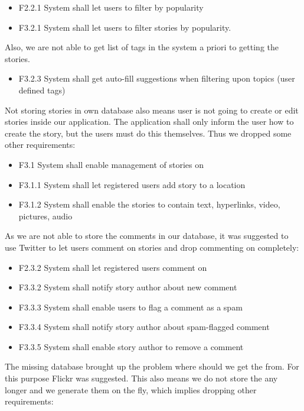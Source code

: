 \documentclass[11pt]{book}
\begin{document}
\begin{itemize}
  \item F2.2.1 System shall let users to filter \wallentityp by popularity
  \item F3.2.1 System shall let users to filter stories by popularity.
\end{itemize}

Also, we are not able to get list of tags in the system a priori to getting the stories.

\begin{itemize}
  \item F3.2.3 System shall get auto-fill suggestions when filtering upon topics (user defined tags)
\end{itemize}

Not storing stories in own database also means user is not going to create or edit stories inside our application. The application shall only inform the user how to create the story, but the users must do this themselves. Thus we dropped some other requirements:

\begin{itemize}
  \item F3.1 System shall enable management of stories on \wallentityp
  \item F3.1.1 System shall let registered users add story to a location
  \item F3.1.2 System shall enable the stories to contain text, hyperlinks, video, pictures, audio
\end{itemize}

As we are not able to store the comments in our database, it was suggested to use Twitter to let users comment on stories and drop commenting on \wallentityp completely:

\begin{itemize}
  \item F2.3.2 System shall let registered users comment on \wallentityp
  \item F3.3.2 System shall notify story author about new comment
  \item F3.3.3 System shall enable users to flag a comment as a spam
  \item F3.3.4 System shall notify story author about spam-flagged comment
  \item F3.3.5 System shall enable story author to remove a comment
\end{itemize}

The missing database brought up the problem where should we get the \wallentityp from. For this purpose Flickr was suggested. This also means we do not store the \wallentityp any longer and we generate them on the fly, which implies dropping other requirements:
\end{document}

